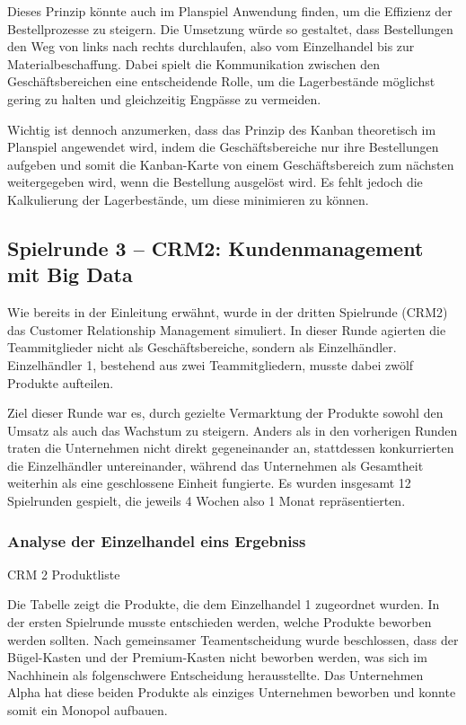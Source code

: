 \documentclass[a4paper,12pt]{article}
\begin{document}
Dieses Prinzip könnte auch im Planspiel Anwendung finden, um die Effizienz der Bestellprozesse zu steigern.
Die Umsetzung würde so gestaltet, dass Bestellungen den Weg von links nach rechts durchlaufen, also vom Einzelhandel bis zur Materialbeschaffung.
Dabei spielt die Kommunikation zwischen den Geschäftsbereichen eine entscheidende Rolle,
um die Lagerbestände möglichst gering zu halten und gleichzeitig Engpässe zu vermeiden.

Wichtig ist dennoch anzumerken, dass das Prinzip des Kanban theoretisch im Planspiel angewendet wird,
indem die Geschäftsbereiche nur ihre Bestellungen aufgeben und somit die Kanban-Karte von 
einem Geschäftsbereich zum nächsten weitergegeben wird,
wenn die Bestellung ausgelöst wird. Es fehlt jedoch die Kalkulierung der Lagerbestände, um diese minimieren zu können.

\subsection{Spielrunde 3 – CRM2: Kundenmanagement mit Big Data}
Wie bereits in der Einleitung erwähnt, wurde in der dritten Spielrunde (CRM2) das Customer Relationship Management simuliert.
In dieser Runde agierten die Teammitglieder nicht als Geschäftsbereiche, sondern als Einzelhändler. 
Einzelhändler 1, bestehend aus zwei Teammitgliedern, musste dabei zwölf Produkte aufteilen.

Ziel dieser Runde war es, durch gezielte Vermarktung der Produkte sowohl den Umsatz als auch das Wachstum zu steigern. 
Anders als in den vorherigen Runden traten die Unternehmen nicht direkt gegeneinander an,
stattdessen konkurrierten die Einzelhändler untereinander,
während das Unternehmen als Gesamtheit weiterhin als eine geschlossene Einheit fungierte.
Es wurden insgesamt 12 Spielrunden gespielt, die jeweils 4 Wochen also 1 Monat repräsentierten.
\subsubsection{Analyse der Einzelhandel eins Ergebniss}
\begin{table}[H]
    \centering
    \caption{CRM 2 Produktliste}
    \label{tab:CRM 2 Produktliste}
\end{table}
Die Tabelle zeigt die Produkte, die dem Einzelhandel 1 zugeordnet wurden.
In der ersten Spielrunde musste entschieden werden, welche Produkte beworben werden sollten.
Nach gemeinsamer Teamentscheidung wurde beschlossen, dass der Bügel-Kasten und der Premium-Kasten nicht beworben werden,
was sich im Nachhinein als folgenschwere Entscheidung herausstellte.
Das Unternehmen Alpha hat diese beiden Produkte als einziges Unternehmen beworben und konnte somit ein Monopol aufbauen.
\end{document}
